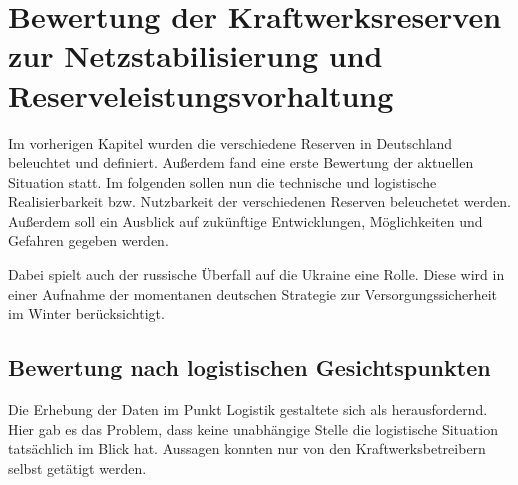 \section{Bewertung der Kraftwerksreserven zur Netzstabilisierung und Reserveleistungsvorhaltung}

Im vorherigen Kapitel wurden die verschiedene Reserven in Deutschland beleuchtet und definiert. Außerdem fand eine erste Bewertung der aktuellen Situation statt. Im folgenden sollen nun die technische und logistische Realisierbarkeit bzw. Nutzbarkeit der verschiedenen Reserven beleuchetet werden. Außerdem soll ein Ausblick auf zukünftige Entwicklungen, Möglichkeiten und Gefahren gegeben werden.

Dabei spielt auch der russische Überfall auf die Ukraine eine Rolle. Diese wird in einer Aufnahme der momentanen deutschen Strategie zur Versorgungssicherheit im Winter berücksichtigt.

	\subsection{Bewertung nach logistischen Gesichtspunkten}
	Die Erhebung der Daten im Punkt Logistik gestaltete sich als herausfordernd. Hier gab es das Problem, dass keine unabhängige Stelle die logistische Situation tatsächlich im Blick hat. Aussagen konnten nur von den Kraftwerksbetreibern selbst getätigt werden.
	
